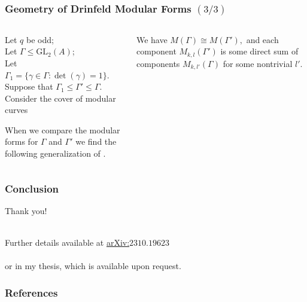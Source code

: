 \documentclass[handout]{beamer}
\numberwithin{equation}{section}
\numberwithin{case}{theorem}
\newcommand{\sX}{\mathscr{X}}		%
\newcommand{\GL}{\mathrm{GL}} 	%
\newcommand{\<}{\left\langle}
\renewcommand{\>}{\right\rangle}
\begin{document}
	\begin{frame}
		\frametitle{Geometry of Drinfeld Modular Forms $(3/3)$}
		\begin{columns} 
			\begin{column}{.5\textwidth}
				Let $q$ be odd;\\
				Let $\Gamma\leq \GL_2(A)$;\\ 
				Let $\Gamma_1=\{\gamma\in \Gamma:\det(\gamma)=1\}.$\\
				Suppose that $\Gamma_1\leq \Gamma'\leq \Gamma.$ \pause \\
				Consider the cover of modular curves
				\begin{figure}[!h]\centering
				\end{figure}\pause
				When we compare the modular forms for $\Gamma$ and $\Gamma'$ we find the following generalization of \cite[Theorem $6.2$]{Franklin-geometry-Drinfeld-modular-forms}.
			\end{column}\pause
			\begin{column}{.5\textwidth}
				\begin{theorem}
					We have $M(\Gamma)\cong M(\Gamma'),$ \pause
					and each component $M_{k,l}(\Gamma')$ is some direct sum of components $M_{k,l'}(\Gamma)$ for some nontrivial $l'.$
				\end{theorem}
			\end{column}
		\end{columns}	
	\end{frame}
	
	\begin{frame}
		\frametitle{Conclusion}
		\centering
		Thank you!\\ \pause 
		
		$~$\\
		
		Further details available at \href{https://arxiv.org/abs/2310.19623}{arXiv:$2310.19623$}\\
		
		$~$\\
		
		or in my thesis, which is available upon request. 
	\end{frame}
	
	\begin{frame}[allowframebreaks]
		\frametitle{References}
		
		
	\end{frame}
	
	
\end{document}
